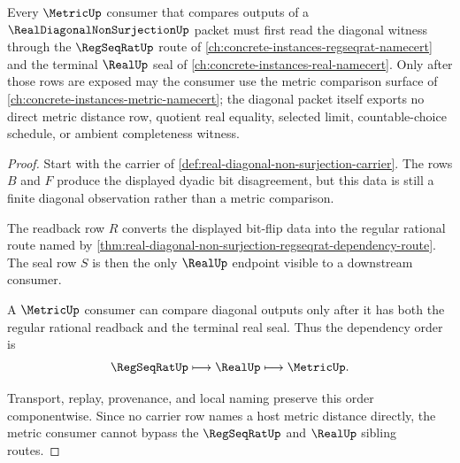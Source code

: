 \begin{theorem}
\label{thm:real-diagonal-non-surjection-metric-dependency-route}
Every $\MetricUp$ consumer that compares outputs of a $\RealDiagonalNonSurjectionUp$ packet must first read the diagonal witness through the $\RegSeqRatUp$ route of \autoref{ch:concrete-instances-regseqrat-namecert} and the terminal $\RealUp$ seal of \autoref{ch:concrete-instances-real-namecert}. Only after those rows are exposed may the consumer use the metric comparison surface of \autoref{ch:concrete-instances-metric-namecert}; the diagonal packet itself exports no direct metric distance row, quotient real equality, selected limit, countable-choice schedule, or ambient completeness witness.
\end{theorem}
\begin{proof}
Start with the carrier of \autoref{def:real-diagonal-non-surjection-carrier}. The rows $B$ and $F$ produce the displayed dyadic bit disagreement, but this data is still a finite diagonal observation rather than a metric comparison.

The readback row $R$ converts the displayed bit-flip data into the regular rational route named by \autoref{thm:real-diagonal-non-surjection-regseqrat-dependency-route}. The seal row $S$ is then the only $\RealUp$ endpoint visible to a downstream consumer.

A $\MetricUp$ consumer can compare diagonal outputs only after it has both the regular rational readback and the terminal real seal. Thus the dependency order is
$$
\RegSeqRatUp \longmapsto \RealUp \longmapsto \MetricUp .
$$

Transport, replay, provenance, and local naming preserve this order componentwise. Since no carrier row names a host metric distance directly, the metric consumer cannot bypass the $\RegSeqRatUp$ and $\RealUp$ sibling routes.
\end{proof}
